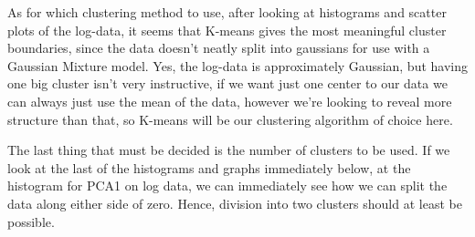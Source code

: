 \documentclass{article}
\begin{document}
As for which clustering method to use, after looking at histograms and
scatter plots of the log-data, it seems that K-means gives the most
meaningful cluster boundaries, since the data doesn't neatly split into
gaussians for use with a Gaussian Mixture model. Yes, the log-data is
approximately Gaussian, but having one big cluster isn't very
instructive, if we want just one center to our data we can always just
use the mean of the data, however we're looking to reveal more structure
than that, so K-means will be our clustering algorithm of choice here.

The last thing that must be decided is the number of clusters to be
used. If we look at the last of the histograms and graphs immediately
below, at the histogram for PCA1 on log data, we can immediately see how
we can split the data along either side of zero. Hence, division into
two clusters should at least be possible.
\end{document}

